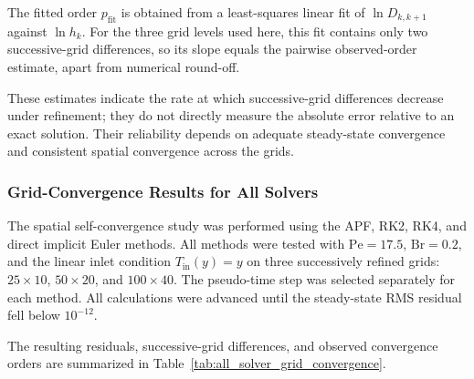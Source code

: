 The fitted order $p_{\mathrm{fit}}$ is obtained from a
least-squares linear fit of $\ln D_{k,k+1}$ against $\ln h_k$.
For the three grid levels used here, this fit contains only
two successive-grid differences, so its slope equals the
pairwise observed-order estimate, apart from numerical
round-off.

These estimates indicate the rate at which successive-grid
differences decrease under refinement; they do not directly
measure the absolute error relative to an exact solution.
Their reliability depends on adequate steady-state convergence
and consistent spatial convergence across the grids.

\subsubsection{Grid-Convergence Results for All Solvers}
\label{subsec:grid_convergence_results}

The spatial self-convergence study was performed using the
APF, RK2, RK4, and direct implicit Euler methods. All methods
were tested with $\mathrm{Pe}=17.5$, $\mathrm{Br}=0.2$, and
the linear inlet condition $T_{\mathrm{in}}(y)=y$ on three
successively refined grids:
$25\times10$, $50\times20$, and $100\times40$.
The pseudo-time step was selected separately for each method.
All calculations were advanced until the steady-state RMS
residual fell below $10^{-12}$.

The resulting residuals, successive-grid differences, and
observed convergence orders are summarized in
Table~\ref{tab:all_solver_grid_convergence}.

\begin{table}[H]
\centering
\caption{Steady-state residuals and spatial self-convergence
results for the four numerical methods.}
\label{tab:all_solver_grid_convergence}
\small
\setlength{\tabcolsep}{4pt}
\renewcommand{\arraystretch}{1.3}
\end{table}

